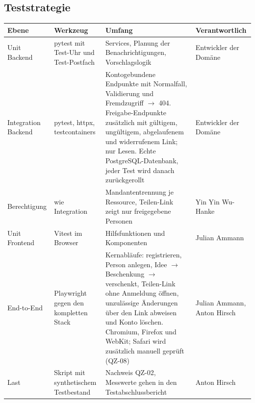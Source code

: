 \documentclass[11pt,a4paper]{article}
\begin{document}
\subsection{Teststrategie}

{\small
\begin{tabularx}{\linewidth}{@{}>{\hsize=0.58\hsize\RaggedRight\arraybackslash}X >{\hsize=0.89\hsize\RaggedRight\arraybackslash}X >{\hsize=1.79\hsize\RaggedRight\arraybackslash}X >{\hsize=0.74\hsize\RaggedRight\arraybackslash}X@{}}
\toprule
\textbf{Ebene} & \textbf{Werkzeug} & \textbf{Umfang} & \textbf{Verantwortlich} \\
\midrule
\endhead
Unit Backend & pytest mit Test-Uhr und Test-Postfach & Services, Planung der Benachrichtigungen, Vorschlagslogik & Entwickler der Domäne \\
Integration Backend & pytest, httpx, testcontainers & Kontogebundene Endpunkte mit Normalfall, Validierung und Fremdzugriff $\rightarrow$ 404. Freigabe-Endpunkte zusätzlich mit gültigem, ungültigem, abgelaufenem und widerrufenem Link; nur Lesen. Echte PostgreSQL-Datenbank, jeder Test wird danach zurückgerollt & Entwickler der Domäne \\
Berechtigung & wie Integration & Mandantentrennung je Ressource, Teilen-Link zeigt nur freigegebene Personen & Yin Yin Wu-Hanke \\
Unit Frontend & Vitest im Browser & Hilfsfunktionen und Komponenten & Julian Ammann \\
End-to-End & Playwright gegen den kompletten Stack & Kernabläufe: registrieren, Person anlegen, Idee $\rightarrow$ Beschenkung $\rightarrow$ verschenkt, Teilen-Link ohne Anmeldung öffnen, unzulässige Änderungen über den Link abweisen und Konto löschen. Chromium, Firefox und WebKit; Safari wird zusätzlich manuell geprüft (QZ-08) & Julian Ammann, Anton Hirsch \\
Last & Skript mit synthetischem Testbestand & Nachweis QZ-02, Messwerte gehen in den Testabschlussbericht & Anton Hirsch \\
\bottomrule
\end{tabularx}
}
\end{document}
